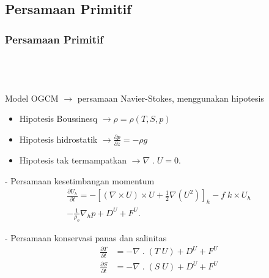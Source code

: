 \documentclass{beamer}
\begin{document}
\subsection{Persamaan Primitif}
\begin{frame}[allowframebreaks]
	\frametitle{Persamaan Primitif}
	$\;$ \\
	$\;$ \\
	$\;$ \\
	Model OGCM $\rightarrow$ persamaan Navier-Stokes, menggunakan hipotesis
	\begin{itemize}
		\item {\small Hipotesis Boussinesq $\rightarrow \rho = \rho(T,S,p)$}
		\item {\small Hipotesis hidrostatik $\rightarrow \frac{\partial p}{\partial z} = -\rho g$}
		\item {\small Hipotesis tak termampatkan $\rightarrow \nabla \;.\; U = 0$}.
	\end{itemize}
	\newpage
		- Persamaan kesetimbangan momentum
	\begin{equation}
		\begin{aligned}
			\frac{\partial U_h}{\partial t} = - \left[(\nabla \times U) \times U + \frac{1}{2}\nabla (U^2)\right]_h - f \; k \times U_h \\
			- \frac{1}{\rho_o}\nabla_h p + D^U + F^U.
		\end{aligned}
	\end{equation}

	- Persamaan konservasi panas dan salinitas
	\begin{equation}
		\begin{aligned}
			\frac{\partial T}{\partial t} &= - \nabla \; . \; (T\;U)  + D^U + F^U \\
			\frac{\partial S}{\partial t} &= - \nabla \; . \; (S\;U)  + D^U + F^U
		\end{aligned}
	\end{equation}
\end{frame}
\end{document}
